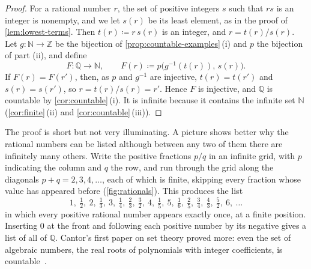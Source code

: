\begin{proof}
For a rational number $r$, the set of positive integers $s$ such that $rs$ is an integer is nonempty, and we let $s(r)$ be its least element, as in the proof of \cref{lem:lowest-terms}. Then $t(r)\coloneqq r\,s(r)$ is an integer, and $r=t(r)/s(r)$. Let $g\colon\mathbb N\to\mathbb Z$ be the bijection of \cref{prop:countable-examples}\,(i) and $p$ the bijection of part (ii), and define
\[
F\colon\mathbb Q\to\mathbb N,\qquad F(r)\coloneqq p\bigl(g^{-1}(t(r)),\,s(r)\bigr).
\]
If $F(r)=F(r')$, then, as $p$ and $g^{-1}$ are injective, $t(r)=t(r')$ and $s(r)=s(r')$, so $r=t(r)/s(r)=r'$. Hence $F$ is injective, and $\mathbb Q$ is countable by \cref{cor:countable}\,(i). It is infinite because it contains the infinite set $\mathbb N$ (\cref{cor:finite}\,(ii) and \cref{cor:countable}\,(iii)).
\end{proof}

The proof is short but not very illuminating. A picture shows better why the rational numbers can be listed although between any two of them there are infinitely many others. Write the positive fractions $p/q$ in an infinite grid, with $p$ indicating the column and $q$ the row, and run through the grid along the diagonals $p+q=2,3,4,\ldots$, each of which is finite, skipping every fraction whose value has appeared before (\cref{fig:rationals}). This produces the list
\[
1,\ \tfrac12,\ 2,\ \tfrac13,\ 3,\ \tfrac14,\ \tfrac23,\ \tfrac32,\ 4,\ \tfrac15,\ 5,\ \tfrac16,\ \tfrac25,\ \tfrac34,\ \tfrac43,\ \tfrac52,\ 6,\ \ldots
\]
in which every positive rational number appears exactly once, at a finite position. Inserting $0$ at the front and following each positive number by its negative gives a list of all of $\mathbb Q$. Cantor's first paper on set theory proved more: even the set of algebraic numbers, the real roots of polynomials with integer coefficients, is countable~\cite{cantor1874}.

